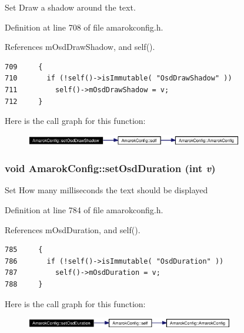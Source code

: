 Set Draw a shadow around the text. 

Definition at line 708 of file amarokconfig.h.

References m\-Osd\-Draw\-Shadow, and self().



\footnotesize\begin{verbatim}709     {
710       if (!self()->isImmutable( "OsdDrawShadow" ))
711         self()->mOsdDrawShadow = v;
712     }
\end{verbatim}\normalsize 


Here is the call graph for this function:\begin{figure}[H]
\begin{center}
\leavevmode
\includegraphics[width=269pt]{classAmarokConfig_AmarokConfige73_cgraph}
\end{center}
\end{figure}
\subsubsection{\setlength{\rightskip}{0pt plus 5cm}void Amarok\-Config::set\-Osd\-Duration (int {\em v})\hspace{0.3cm}{\tt  [inline, static]}}\label{classAmarokConfig_AmarokConfige81}


Set How many milliseconds the text should be displayed 

Definition at line 784 of file amarokconfig.h.

References m\-Osd\-Duration, and self().



\footnotesize\begin{verbatim}785     {
786       if (!self()->isImmutable( "OsdDuration" ))
787         self()->mOsdDuration = v;
788     }
\end{verbatim}\normalsize 


Here is the call graph for this function:\begin{figure}[H]
\begin{center}
\leavevmode
\includegraphics[width=258pt]{classAmarokConfig_AmarokConfige81_cgraph}
\end{center}
\end{figure}
